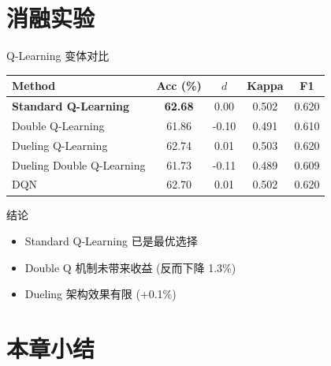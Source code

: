 \section{消融实验}

\begin{frame}{Q-Learning 变体对比}
    \begin{table}[h]
        \centering
        \begin{tabular}{lcccc}
            \hline
            \textbf{Method} & \textbf{Acc (\%)} & \textbf{$d$} & \textbf{Kappa} & \textbf{F1} \\
            \hline
            \textbf{Standard Q-Learning} & \textbf{62.68} & 0.00 & 0.502 & 0.620 \\
            Double Q-Learning & 61.86 & -0.10 & 0.491 & 0.610 \\
            Dueling Q-Learning & 62.74 & 0.01 & 0.503 & 0.620 \\
            Dueling Double Q-Learning & 61.73 & -0.11 & 0.489 & 0.609 \\
            DQN & 62.70 & 0.01 & 0.502 & 0.620 \\
            \hline
        \end{tabular}
    \end{table}
    
    \vspace{0.3cm}
    \begin{alertblock}{结论}
        \begin{itemize}
            \item Standard Q-Learning 已是最优选择
            \item Double Q 机制未带来收益 (反而下降 1.3\%)
            \item Dueling 架构效果有限 (+0.1\%)
        \end{itemize}
    \end{alertblock}
\end{frame}

\section{本章小结}

